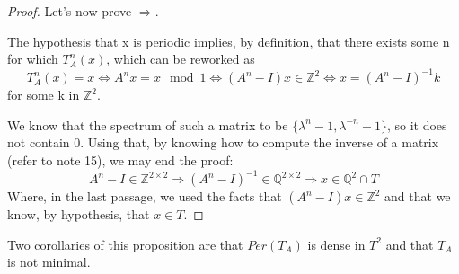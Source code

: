 \begin{proof}
    Let's now prove $\Rightarrow$. 

    The hypothesis that x is periodic implies, by definition, that there exists some n for which $T_A^n(x)$, which can be reworked as \begin{equation*}
    T_A^n(x)=x\iff A^nx=x \mod 1\iff(A^n-I)x\in\mathbb{Z}^2\iff x=(A^n-I)^{-1}k
    \end{equation*} for some k in $\mathbb{Z}^2$. 
    
    We know that the spectrum of such a matrix to be $\{\lambda^n-1, \lambda^{-n}-1\}$, so it does not contain 0. Using that, by knowing how to compute the inverse of a matrix (refer to note 15), we may end the proof: \begin{equation*}A^n-I\in\mathbb{Z}^{2\times2}\Rightarrow(A^n-I)^{-1}\in\mathbb{Q}^{2\times2}\Rightarrow x\in\mathbb{Q}^2 \cap T \end{equation*}
    Where, in the last passage, we used the facts that $(A^n-I)x\in\mathbb{Z}^2$ and that we know, by hypothesis, that $x\in T$.
\end{proof}
\begin{observation}
    Two corollaries of this proposition are that $Per(T_A)$ is dense in $T^2$ and that $T_A$ is not minimal.
\end{observation}

